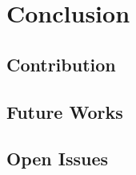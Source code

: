 \chapter{Conclusion}
\label{chp:conclude}
\section{Contribution}
\section{Future Works}
\section{Open Issues}